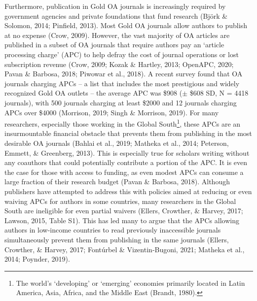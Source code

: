 \documentclass[
  english,
  man]{apa6}
\begin{document}
Furthermore, publication in Gold OA journals is increasingly required by government agencies and private foundations that fund research (Björk \& Solomon, 2014; Pinfield, 2013). Most Gold OA journals allow authors to publish at no expense (Crow, 2009). However, the vast majority of OA articles are published in a subset of OA journals that require authors pay an `article processing charge' (APC) to help defray the cost of journal operations or lost subscription revenue (Crow, 2009; Kozak \& Hartley, 2013; OpenAPC, 2020; Pavan \& Barbosa, 2018; Piwowar et al., 2018). A recent survey found that OA journals charging APCs -- a list that includes the most prestigious and widely recognized Gold OA outlets -- the average APC was \$908 (\(\pm\) \$608 SD, N = 4418 journals), with 500 journals charging at least \$2000 and 12 journals charging APCs over \$4000 (Morrison, 2019; Singh \& Morrison, 2019). For many researchers, especially those working in the Global South\footnote{The world's `developing' or `emerging' economies primarily located in Latin America, Asia, Africa, and the Middle East (Brandt, 1980).}, these APCs are an insurmountable financial obstacle that prevents them from publishing in the most desirable OA journals (Bahlai et al., 2019; Matheka et al., 2014; Peterson, Emmett, \& Greenberg, 2013). This is especially true for scholars writing without any coauthors that could potentially contribute a portion of the APC. It is even the case for those with access to funding, as even modest APCs can consume a large fraction of their research budget (Pavan \& Barbosa, 2018). Although publishers have attempted to address this with policies aimed at reducing or even waiving APCs for authors in some countries, many researchers in the Global South are ineligible for even partial waivers (Ellers, Crowther, \& Harvey, 2017; Lawson, 2015, Table S1). This has led many to argue that the APCs allowing authors in low-income countries to read previously inaccessible journals simultaneously prevent them from publishing in the same journals (Ellers, Crowther, \& Harvey, 2017; Fontúrbel \& Vizentin‐Bugoni, 2021; Matheka et al., 2014; Poynder, 2019).\\
\end{document}
